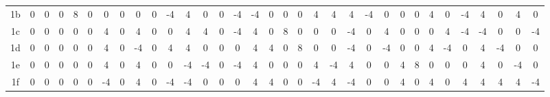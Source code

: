 \documentclass[11pt]{article}
\begin{document}
\begin{table}[htbp]
{\begin{tabular}{c|*{32}{c}}
    1b & 0 & 0 & 0 & 8 & 0 & 0 & 0 & 0 & 0 & -4 & 4 & 0 & 0 & -4 & -4 & 0 & 0 & 0 & 4 & 4 & 4 & -4 & 0 & 0 & 0 & 4 & 0 & -4 & 4 & 0 & 4 & 0 \\
    1c & 0 & 0 & 0 & 0 & 0 & 4 & 0 & 4 & 0 & 0 & 4 & 4 & 0 & -4 & 4 & 0 & 8 & 0 & 0 & 0 & -4 & 0 & 4 & 0 & 0 & 0 & 4 & -4 & -4 & 0 & 0 & -4 \\
    1d & 0 & 0 & 0 & 0 & 0 & 4 & 0 & -4 & 0 & 4 & 4 & 0 & 0 & 0 & 4 & 4 & 0 & 8 & 0 & 0 & -4 & 0 & -4 & 0 & 0 & 4 & -4 & 0 & 4 & -4 & 0 & 0 \\
    1e & 0 & 0 & 0 & 0 & 0 & 4 & 0 & 4 & 0 & 0 & -4 & -4 & 0 & -4 & 4 & 0 & 0 & 0 & 4 & -4 & 4 & 0 & 0 & 4 & 8 & 0 & 0 & 0 & 4 & 0 & -4 & 0 \\
    1f & 0 & 0 & 0 & 0 & 0 & -4 & 0 & 4 & 0 & -4 & -4 & 0 & 0 & 0 & 4 & 4 & 0 & 0 & -4 & 4 & -4 & 0 & 0 & 4 & 0 & 4 & 0 & 4 & 4 & 4 & 4 & -4 \\
    \bottomrule
    \end{tabular}
}
\end{table}
\end{document}
